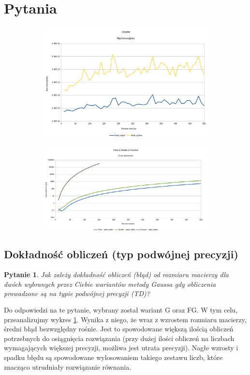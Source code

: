 \documentclass[10pt]{article}
\newtheorem{que}{Pytanie}
\begin{document}
\section{Pytania}
\begin{figure}[h]
	\caption{Wykresy reprezentujące błąd bezwzględny dla różnych sposobów sumowania}
	\begin{subfigure}{0.5\textwidth}
		\includegraphics[width=\textwidth]{double_full_none_blad.png}
		\caption{ \label{Rys3a}}
	\end{subfigure}
	\hfill
	\begin{subfigure}{0.5\textwidth}
		\includegraphics[width=\textwidth]{float_double_fract_full_czas.png}
		\caption{  \label{Rys3b}}
	\end{subfigure}
\end{figure}
\subsection{Dokładność obliczeń (typ podwójnej precyzji)}
\begin{que}
	Jak zależy dokładność obliczeń (błąd) od rozmiaru macierzy dla dwóch wybranych
	przez Ciebie wariantów metody Gaussa gdy obliczenia prowadzone są na typie
	podwójnej precyzji (TD)?\label{que:1}
\end{que}
Do odpowiedzi na te pytanie, wybrany został wariant G oraz FG. W tym celu, przeanalizujmy wykres \ref{Rys3a}.
Wynika z niego, że wraz z wzrostem rozmiaru macierzy, średni błąd bezwzględny rośnie. Jest to spowodowane większą ilością obliczeń potrzebnych do osiągnięcia rozwiązania (przy dużej ilości obliczeń na liczbach wymagających większej precyzji, możliwa jest utrata precyzji). Nagłe wzrosty i spadku błędu są spowodowane wylosowaniem takiego zestawu liczb, które znacząco utrudniały rozwiązanie równania.
\end{document}

